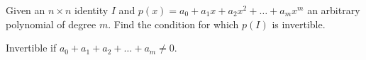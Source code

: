 
\begin{Exercise}[
name={},
title={}, 
difficulty=0,
origin={\cite{YL}}]
Given an $n\times n$ identity $I$ and $p(x)=a_0+a_1x+a_2x^2+\ldots+a_mx^m$ an 
arbitrary polynomial of degree $m$.  Find the condition for which $p(I)$ is invertible.
\end{Exercise}

\begin{Answer}
Invertible if $a_0+a_1+a_2+\ldots+a_m\neq 0$.
\end{Answer}
